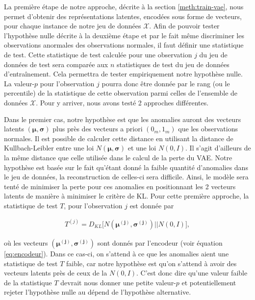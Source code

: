 La première étape de notre approche, décrite à la section \ref{meth:train-vae}, nous permet d'obtenir des représentations latentes, encodées sous forme de vecteurs, pour chaque instance de notre jeu de données $\mathcal{X}$. Afin de pouvoir tester l'hypothèse nulle décrite à la deuxième étape et par le fait même discriminer les observations anormales des observations normales, il faut définir une statistique de test. Cette statistique de test calculée pour une observation $j$ du jeu de données de test sera comparée aux $n$ statistiques de test du jeu de données d'entraînement. Cela permettra de tester empiriquement notre hypothèse nulle. La valeur-$p$ pour l'observation $j$ pourra donc être donnée par le rang (ou le percentile) de la statistique de cette observation parmi celles de l'ensemble de données $\mathcal{X}$.  Pour y arriver, nous avons testé 2 approches différentes.

Dans le premier cas, notre hypothèse est que les anomalies auront des vecteurs latents $(\boldsymbol{\mu}, \boldsymbol{\sigma})$ plus près des vecteurs a priori $(0_m, 1_m)$ que les observations normales. Il est possible de calculer cette distance en utilisant la distance de Kullbach-Leibler entre une loi $N(\boldsymbol{\mu}, \boldsymbol{\sigma})$ et une loi $N(0,I)$. Il s'agit d'ailleurs de la même distance que celle utilisée dans le calcul de la perte du VAE. Notre hypothèse est basée sur le fait qu'étant donné la faible quantité d'anomalies dans le jeu de données, la reconstruction de celles-ci sera difficile. Ainsi, le modèle sera tenté de minimiser la perte pour ces anomalies en positionnant les 2 vecteurs latents de manière à minimiser le critère de KL. Pour cette première approche, la statistique de test $T$, pour l'observation $j$ est donnée par

\begin{gather}  \label{eq:stat_1}
T^{(j)} = D_{KL}\big[N(\boldsymbol{\mu^{(j)}}, \boldsymbol{\sigma^{(j)}}) || N(0, I)\big],
\end{gather}

où les vecteurs $(\boldsymbol{\mu^{(j)}}, \boldsymbol{\sigma^{(j)}})$  sont donnés par l'encodeur (voir équation \ref{eq:encodeur}). Dans ce cas-ci, on s'attend à ce que les anomalies aient une statistique de test $T$ faible, car notre hypothèse est qu'on s'attend à avoir des vecteurs latents près de ceux de la $N(0,I)$. C'est donc dire qu'une valeur faible de la statistique $T$ devrait nous donner une petite valeur-$p$ et potentiellement rejeter l'hypothèse nulle au dépend de l'hypothèse alternative.


